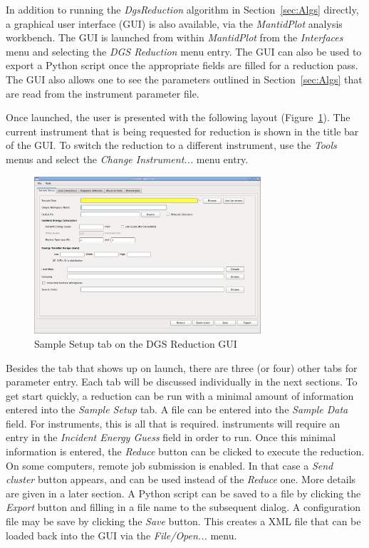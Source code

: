 In addition to running the \textit{DgsReduction} algorithm in Section~\ref{sec:Algs} directly, a graphical user interface (GUI) is also available, via the \textit{MantidPlot} analysis workbench. The GUI is launched from within \textit{MantidPlot} from the \textit{Interfaces} menu and selecting the \textit{DGS Reduction} menu entry. The GUI can also be used to export a Python script once the appropriate fields are filled for a reduction pass. The GUI also allows one to see the parameters outlined in Section~\ref{sec:Algs} that are read from the instrument parameter file. 

Once launched, the user is presented with the following layout (Figure~\ref{fig:SamSet}). The current instrument that is being requested for reduction is shown in the title bar of the GUI. To switch the reduction to a different instrument, use the \textit{Tools} menus and select the \textit{Change Instrument...} menu entry. 
\begin{figure}[ht]
\centerline{\includegraphics[width=0.75\textwidth]{figures/SampleSetup.png}}
\caption{Sample Setup tab on the DGS Reduction GUI}
\label{fig:SamSet}
\end{figure}
Besides the tab that shows up on launch, there are three (or four) other tabs for parameter entry. Each tab will be discussed individually in the next sections. To get start quickly, a reduction can be run with a minimal amount of information entered into the \textit{Sample Setup} tab. A file can be entered into the \textit{Sample Data} field. For \sns{} instruments, this is all that is required. \isis{} instruments will require an entry in the \textit{Incident Energy Guess} field in order to run. Once this minimal information is entered, the \textit{Reduce} button can be clicked to execute the reduction. On some computers, remote job submission is enabled. In that case a \textit{Send cluster} button appears, and can be used instead of the \textit{Reduce} one. More details are given in a later section. A Python script can be saved to a file by clicking the \textit{Export} button and filling in a file name to the subsequent dialog. A configuration file may be save by clicking the \textit{Save} button. This creates a XML file that can be loaded back into the GUI via the \textit{File/Open...} menu.

